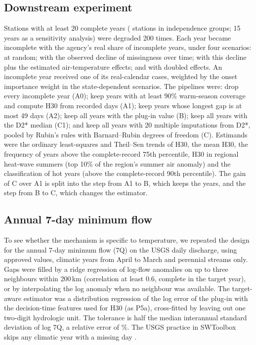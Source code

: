 \documentclass[draft]{agujournal2025}
\begin{document}
\subsection{Downstream experiment}
Stations with at least 20 complete years (\TTrendStations{} stations in \TTrendGroups{} independence groups; 15 years as a sensitivity analysis) were degraded 200 times. Each year became incomplete with the agency's real share of incomplete years, under four scenarios: at random; with the observed decline of missingness over time; with this decline plus the estimated air-temperature effects; and with doubled effects. An incomplete year received one of its real-calendar cases, weighted by the onset importance weight in the state-dependent scenarios. The pipelines were: drop every incomplete year (A0); keep years with at least 90\% warm-season coverage and compute H30 from recorded days (A1); keep years whose longest gap is at most 49 days \cite{johnson2021} (A2); keep all years with the plug-in value (B); keep all years with the D2* median (C1); and keep all years with 20 multiple imputations from D2*, pooled by Rubin's rules with Barnard--Rubin degrees of freedom \cite{rubin1987,barnard1999} (C). Estimands were the ordinary least-squares and Theil--Sen trends of H30, the mean H30, the frequency of years above the complete-record 75th percentile, H30 in regional heat-wave summers (top 10\% of the region's summer air anomaly) and the classification of hot years (above the complete-record 90th percentile). The gain of C over A1 is split into the step from A1 to B, which keeps the years, and the step from B to C, which changes the estimator.

\subsection{Annual 7-day minimum flow}
To see whether the mechanism is specific to temperature, we repeated the design for the annual 7-day minimum flow (7Q) on the USGS daily discharge, using approved values, climatic years from April to March and perennial streams only. Gaps were filled by a ridge regression of log-flow anomalies on up to three neighbours within 200\,km (correlation at least 0.6, complete in the target year), or by interpolating the log anomaly when no neighbour was available. The target-aware estimator was a distribution regression of the log error of the plug-in with the decision-time features used for H30 (as P5a), cross-fitted by leaving out one two-digit hydrologic unit. The tolerance is half the median interannual standard deviation of log 7Q, a relative error of \TFlowTol\%. The USGS practice in SWToolbox skips any climatic year with a missing day \cite{kiang2018}.
\end{document}
